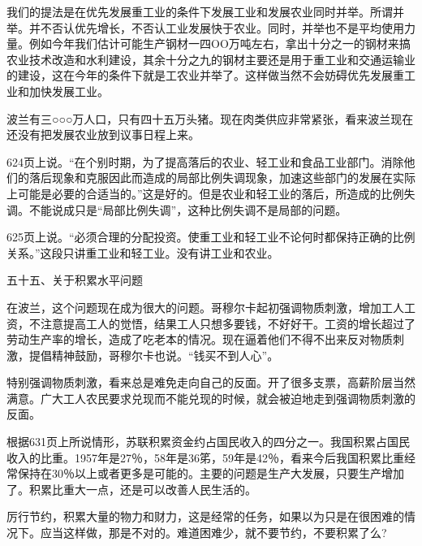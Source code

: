 我们的提法是在优先发展重工业的条件下发展工业和发展农业同时并举。所谓并举。并不否认优先增长，不否认工业发展快于农业。同时，并举也不是平均使用力量。例如今年我们估计可能生产钢材一四OO万吨左右，拿出十分之一的钢材来搞农业技术改造和水利建设，其余十分之九的钢材主要还是用于重工业和交通运输业的建设，这在今年的条件下就是工农业并举了。这样做当然不会妨碍优先发展重工业和加快发展工业。

波兰有三○○○万人口，只有四十五万头猪。现在肉类供应非常紧张，看来波兰现在还没有把发展农业放到议事日程上来。

624页上说。“在个别时期，为了提高落后的农业、轻工业和食品工业部门。消除他们的落后现象和克服因此而造成的局部比例失调现象，加速这些部门的发展在实际上可能是必要的合适当的。”这是好的。但是农业和轻工业的落后，所造成的比例失调。不能说成只是“局部比例失调”，这种比例失调不是局部的问题。

625页上说。“必须合理的分配投资。使重工业和轻工业不论何时都保持正确的比例关系。”这段只讲重工业和轻工业。没有讲工业和农业。

五十五、关于积累水平问题

在波兰，这个问题现在成为很大的问题。哥穆尔卡起初强调物质刺激，增加工人工资，不注意提高工人的觉悟，结果工人只想多要钱，不好好干。工资的增长超过了劳动生产率的增长，造成了吃老本的情况。现在逼着他们不得不出来反对物质刺激，提倡精神鼓励，哥穆尔卡也说。“钱买不到人心”。

特别强调物质刺激，看来总是难免走向自己的反面。开了很多支票，高薪阶层当然满意。广大工人农民要求兑现而不能兑现的时候，就会被迫地走到强调物质刺激的反面。

根据631页上所说情形，苏联积累资金约占国民收入的四分之一。我国积累占国民收入的比重。1957年是27％，58年是36笫，59年是42％，看来今后我国积累比重经常保持在30％以上或者更多是可能的。主要的问题是生产大发展，只要生产增加了。积累比重大一点，还是可以改善人民生活的。

厉行节约，积累大量的物力和财力，这是经常的任务，如果以为只是在很困难的情况下。应当这样做，那是不对的。难道困难少，就不要节约，不要积累了么?


